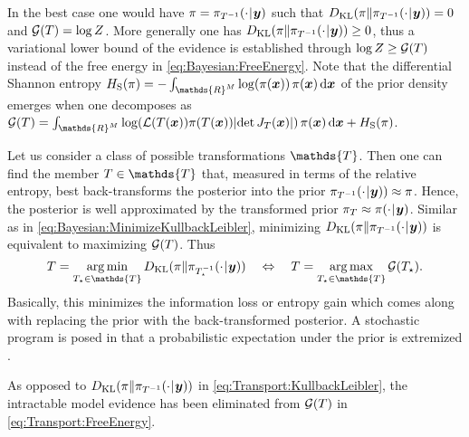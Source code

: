 \par %
In the best case one would have \(\pi = \pi_{T^{-1}}(\cdot {\:\!}|{\:\!} \bm{y})\) such that
\(D_{\mathrm{KL}}(\pi \| \pi_{T^{-1}}(\cdot {\:\!}|{\:\!} \bm{y})) = 0\) and \(\mathcal{G}(T) = \log Z\).
More generally one has \(D_{\mathrm{KL}}(\pi \| \pi_{T^{-1}}(\cdot {\:\!}|{\:\!} \bm{y})) \geq 0\),
thus a variational lower bound of the evidence is established through \(\log Z \geq \mathcal{G}(T)\) instead of the free energy in \cref{eq:Bayesian:FreeEnergy}.
Note that the differential Shannon entropy \(H_{\mathrm{S}}(\pi) = - \int_{\mathds{R}^\dimParam} \log(\pi(\bm{x})) \, \pi(\bm{x}) \, \mathrm{d} \bm{x}\)
of the prior density emerges when one decomposes as
\(\mathcal{G}(\map) = \int_{\mathds{R}^\dimParam} \log(\mathcal{L}(\map(\bm{x})) \pi(\map(\bm{x})) \lvert \det J_\map(\bm{x}) \rvert) \, \pi(\bm{x}) \, \mathrm{d} \bm{x} + H_{\mathrm{S}}(\pi)\).
\par %
Let us consider a class of possible transformations \(\mathds{\map}\).
Then one can find the member \(\map \in \mathds{\map}\) that, measured in terms of the relative entropy,
best back-transforms the posterior into the prior \(\pi_{T^{-1}}(\cdot {\:\!}|{\:\!} \bm{y})) \approx \pi\).
Hence, the posterior is well approximated by the transformed prior \(\pi_{T} \approx \pi(\cdot {\:\!}|{\:\!} \bm{y})\).
Similar as in \cref{eq:Bayesian:MinimizeKullbackLeibler}, minimizing \(D_{\mathrm{KL}}(\pi \| \pi_{T^{-1}}(\cdot {\:\!}|{\:\!} \bm{y}))\) is equivalent to maximizing \(\mathcal{G}(T)\).
Thus
\begin{equation} \label{eq:Transport:MinimizeKullbackLeibler}
  \map = \operatorname*{arg\,min}_{\map_\star \in \mathds{\map}} D_{\mathrm{KL}}(\pi \| \pi_{\map_\star^{-1}}(\cdot \cond \bm{y}))
  \quad \Leftrightarrow \quad
  \map = \operatorname*{arg\,max}_{\map_\star \in \mathds{\map}} \mathcal{G}(\map_\star).
\end{equation}
Basically, this minimizes the information loss or entropy gain which comes along with replacing the prior with the back-transformed posterior.
A stochastic program is posed in that a probabilistic expectation under the prior is extremized \cite{Optim:Prekopa1995,Optim:Shapiro2014}.
\par %
As opposed to \(D_{\mathrm{KL}}(\pi \| \pi_{T^{-1}}(\cdot {\:\!}|{\:\!} \bm{y}))\) in \cref{eq:Transport:KullbackLeibler},
the intractable model evidence has been eliminated from \(\mathcal{G}(T)\) in \cref{eq:Transport:FreeEnergy}.
